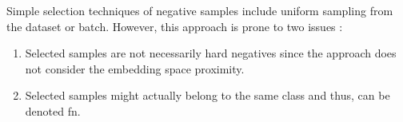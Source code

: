 Simple selection techniques of negative samples include uniform sampling from the dataset or batch.
However, this approach is prone to two issues \citet{robinson_contrastive_2021}:
\begin{enumerate}
    \item Selected samples are not necessarily hard negatives since the approach does not consider the embedding space proximity.
    \item Selected samples might actually belong to the same class and thus, can be denoted \ac{fn}.
\end{enumerate}

